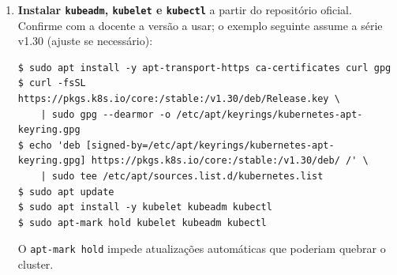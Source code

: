 \documentclass[11pt,a4paper]{article}
\begin{document}
\begin{enumerate}[label=\arabic*.,resume]
  \item \textbf{Instalar \texttt{kubeadm}, \texttt{kubelet} e \texttt{kubectl}} a partir do repositório oficial. Confirme com a docente a versão a usar; o exemplo seguinte assume a série v1.30 (ajuste se necessário):
\begin{lstlisting}
$ sudo apt install -y apt-transport-https ca-certificates curl gpg
$ curl -fsSL https://pkgs.k8s.io/core:/stable:/v1.30/deb/Release.key \
    | sudo gpg --dearmor -o /etc/apt/keyrings/kubernetes-apt-keyring.gpg
$ echo 'deb [signed-by=/etc/apt/keyrings/kubernetes-apt-keyring.gpg] https://pkgs.k8s.io/core:/stable:/v1.30/deb/ /' \
    | sudo tee /etc/apt/sources.list.d/kubernetes.list
$ sudo apt update
$ sudo apt install -y kubelet kubeadm kubectl
$ sudo apt-mark hold kubelet kubeadm kubectl
\end{lstlisting}
  O \texttt{apt-mark hold} impede atualizações automáticas que poderiam quebrar o cluster.

\end{enumerate}
\end{document}
